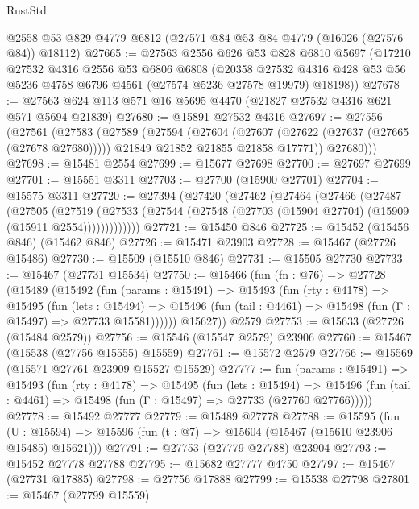 \begin{lexlean}{RustStd}
\begin{coremodule}
    @2558
    @53
    @829
    @4779
    @6812
    (@27571 @84 @53 @84 @4779 (@16026 (@27576 @84)) @18112)
@27665 := @27563
    @2556
    @626
    @53
    @828
    @6810
    @5697
    (@17210
      @27532
      @4316
      @2556
      @53
      @6806
      @6808
      (@20358
        @27532
        @4316
        @428
        @53
        @56
        @5236
        @4758
        @6796
        @4561
        (@27574 @5236 @27578 @19979)
        @18198))
@27678 := @27563 @624 @113 @571 @16 @5695 @4470 (@21827 @27532 @4316 @621 @571 @5694 @21839)
@27680 := @15891 @27532 @4316
@27697 := @27556
    (@27561
      (@27583
        (@27589
          (@27594
            (@27604
              (@27607 (@27622 (@27637 (@27665 (@27678 @27680)))))
              @21849
              @21852
              @21855
              @21858
              @17771))
          @27680)))
@27698 := @15481 @2554
@27699 := @15677 @27698
@27700 := @27697 @27699
@27701 := @15551 @3311
@27703 := @27700 (@15900 @27701)
@27704 := @15575 @3311
@27720 := @27394
    (@27420
      (@27462
        (@27464
          (@27466
            (@27487
              (@27505
                (@27519
                  (@27533 (@27544 (@27548 (@27703 (@15904 @27704) (@15909 (@15911 @2554)))))))))))))
@27721 := @15450 @846
@27725 := @15452 (@15456 @846) (@15462 @846)
@27726 := @15471 @23903
@27728 := @15467 (@27726 @15486)
@27730 := @15509 (@15510 @846)
@27731 := @15505 @27730
@27733 := @15467 (@27731 @15534)
@27750 := @15466
    (fun (fn : @76) =>
    @27728
      (@15489
        (@15492
          (fun (params : @15491) =>
          @15493
            (fun (rty : @4178) =>
            @15495
              (fun (lets : @15494) =>
              @15496 (fun (tail : @4461) => @15498 (fun (Γ : @15497) => @27733 @15581))))))
        @15627))
    @2579
@27753 := @15633 (@27726 (@15484 @2579))
@27756 := @15546 (@15547 @2579) @23906
@27760 := @15467 (@15538 (@27756 @15555) @15559)
@27761 := @15572 @2579
@27766 := @15569 (@15571 @27761 @23909 @15527 @15529)
@27777 := fun (params : @15491) =>
  @15493
    (fun (rty : @4178) =>
    @15495
      (fun (lets : @15494) =>
      @15496 (fun (tail : @4461) => @15498 (fun (Γ : @15497) => @27733 (@27760 @27766)))))
@27778 := @15492 @27777
@27779 := @15489 @27778
@27788 := @15595
    (fun (U : @15594) => @15596 (fun (t : @7) => @15604 (@15467 (@15610 @23906 @15485) @15621)))
@27791 := @27753 (@27779 @27788) @23904
@27793 := @15452 @27778 @27788
@27795 := @15682 @27777 @4750
@27797 := @15467 (@27731 @17885)
@27798 := @27756 @17888
@27799 := @15538 @27798
@27801 := @15467 (@27799 @15559)

\end{coremodule}
\end{lexlean}
